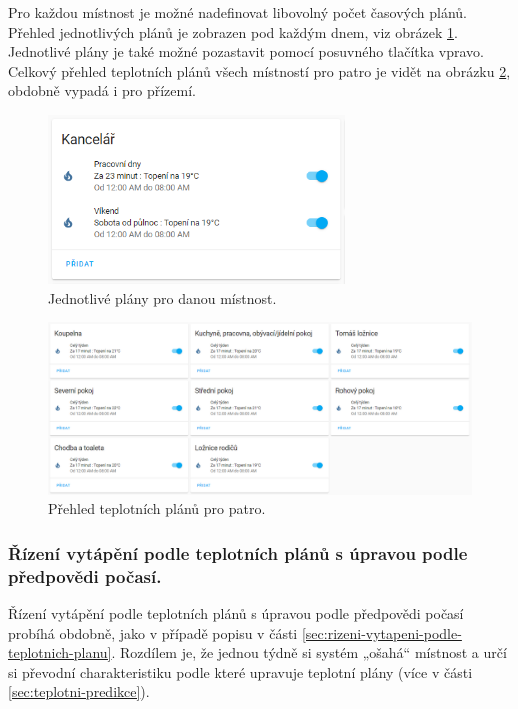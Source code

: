 Pro každou místnost je možné nadefinovat libovolný počet časových plánů. Přehled jednotlivých plánů je zobrazen pod každým dnem, viz obrázek \ref{fig:teplotni-plany-ha}. Jednotlivé plány je také možné pozastavit pomocí posuvného tlačítka vpravo. Celkový přehled teplotních plánů všech místností pro patro je vidět na obrázku \ref{fig:teplotni-plany-prehled-ha}, obdobně vypadá i pro přízemí.

\begin{figure}[H]
    \centering
    \includegraphics[width=0.7\textwidth]{images/software-ha/teplotni-plany-ha.png}
    \caption{Jednotlivé plány pro danou místnost.}
    \label{fig:teplotni-plany-ha}
\end{figure}


\begin{figure}[H]
    \centering
    \includegraphics[width=\textwidth]{images/software-ha/teplotni-plany-prehled-ha.png}
    \caption{Přehled teplotních plánů pro patro.}
    \label{fig:teplotni-plany-prehled-ha}
\end{figure}

\subsubsection{Řízení vytápění podle teplotních plánů s úpravou podle předpovědi počasí.} 
\label{sec:rizeni-vytapeni-podle-teplotnich-planu-s-upravou-podle-predpovedi-pocasi}
Řízení vytápění podle teplotních plánů s úpravou podle předpovědi počasí probíhá obdobně, jako v případě popisu v části \ref{sec:rizeni-vytapeni-podle-teplotnich-planu}. Rozdílem je, že jednou týdně si systém „ošahá“ místnost a určí si převodní charakteristiku podle které  upravuje teplotní plány (více v části \ref{sec:teplotni-predikce}).

